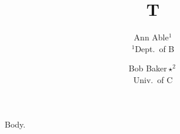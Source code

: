 \documentclass{article}
\title{T}
\author{Ann Able$^{1}$\footremember{zz}{Zebra University.} \\ $^{1}$Dept.\ of B \and Bob Baker$\star^{2}$ \\ Univ.\ of C}
\begin{document}
\maketitle
Body.
\end{document}
